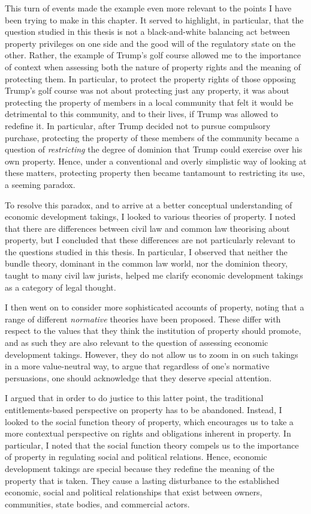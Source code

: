 This turn of events made the example even more relevant to the points I have been trying to make in this chapter. It served to highlight, in particular, that the question studied in this thesis is not a black-and-white balancing act between property privileges on one side and the good will of the regulatory state on the other. Rather, the example of Trump's golf course allowed me to  the importance of context when assessing both the nature of property rights and the meaning of protecting them. In particular, to protect the property rights of those opposing Trump's golf course was not about protecting just any property, it was about protecting the property of members in a local community that felt it would be detrimental to this community, and to their lives, if Trump was allowed to redefine it. In particular, after Trump decided not to pursue compulsory purchase, protecting the property of these members of the community became a question of {\it restricting} the degree of dominion that Trump could exercise over his own property. Hence, under a conventional and overly simplistic way of looking at these matters, protecting property then became tantamount to restricting its use, a seeming paradox.

To resolve this paradox, and to arrive at a better conceptual understanding of economic development takings, I looked to various theories of property. I noted that there are differences between civil law and common law theorising about property, but I concluded that these differences are not particularly relevant to the questions studied in this thesis. In particular, I observed that neither the bundle theory, dominant in the common law world, nor the dominion theory, taught to many civil law jurists, helped me clarify economic development takings as a category of legal thought.

I then went on to consider more sophisticated accounts of property, noting that a range of different {\it normative} theories have been proposed. These differ with respect to the values that they think the institution of property should promote, and as such they are also relevant to the question of assessing economic development takings. However, they do not allow us to zoom in on such takings in a more value-neutral way, to argue that regardless of one's normative persuasions, one should acknowledge that they deserve special attention.

I argued that in order to do justice to this latter point, the traditional entitlements-based perspective on property has to be abandoned. Instead, I looked to the social function theory of property, which encourages us to take a more contextual perspective on rights and obligations inherent in property. In particular, I noted that the social function theory compels us to  the importance of property in regulating social and political relations. Hence, economic development takings are special because they redefine the meaning of the property that is taken. They cause a lasting disturbance to the established economic, social and political relationships that exist between owners, communities, state bodies, and commercial actors. 

